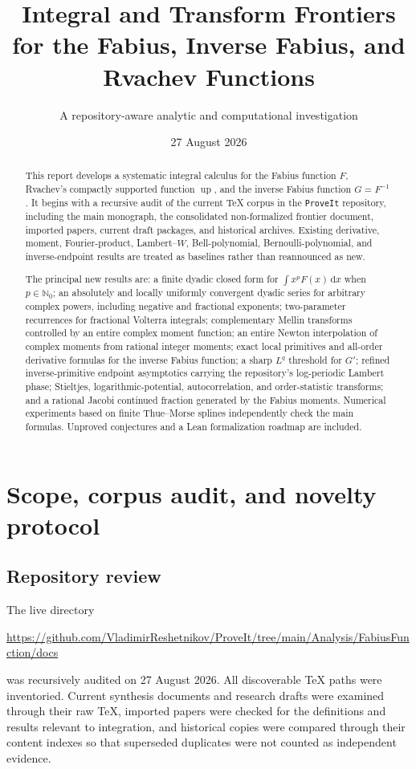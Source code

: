 \documentclass[11pt,oneside]{article}
\title{\bfseries Integral and Transform Frontiers\\[0.25em]
for the Fabius, Inverse Fabius, and Rvachev Functions}
\author{A repository-aware analytic and computational investigation}
\date{27 August 2026}
\theoremstyle{definition}
\theoremstyle{remark}
\newcommand{\N}{\mathbb N}
\newcommand{\dd}{\,\mathrm d}
\newcommand{\upf}{\operatorname{up}}
\newcommand{\repo}{\texttt{ProveIt}}
\begin{document}
\maketitle

\begin{abstract}
This report develops a systematic integral calculus for the Fabius function $F$, Rvachev's compactly supported function $\upf$, and the inverse Fabius function $G=F^{-1}$.  It begins with a recursive audit of the current TeX corpus in the \repo{} repository, including the main monograph, the consolidated non-formalized frontier document, imported papers, current draft packages, and historical archives.  Existing derivative, moment, Fourier-product, Lambert--$W$, Bell-polynomial, Bernoulli-polynomial, and inverse-endpoint results are treated as baselines rather than reannounced as new.

The principal new results are: a finite dyadic closed form for $\int x^pF(x)\dd x$ when $p\in\N_0$; an absolutely and locally uniformly convergent dyadic series for arbitrary complex powers, including negative and fractional exponents; two-parameter recurrences for fractional Volterra integrals; complementary Mellin transforms controlled by an entire complex moment function; an entire Newton interpolation of complex moments from rational integer moments; exact local primitives and all-order derivative formulas for the inverse Fabius function; a sharp $L^q$ threshold for $G'$; refined inverse-primitive endpoint asymptotics carrying the repository's log-periodic Lambert phase; Stieltjes, logarithmic-potential, autocorrelation, and order-statistic transforms; and a rational Jacobi continued fraction generated by the Fabius moments.  Numerical experiments based on finite Thue--Morse splines independently check the main formulas.  Unproved conjectures and a Lean formalization roadmap are included.
\end{abstract}

\tableofcontents
\clearpage

\section{Scope, corpus audit, and novelty protocol}

\subsection{Repository review}

The live directory
\begin{center}
\url{https://github.com/VladimirReshetnikov/ProveIt/tree/main/Analysis/FabiusFunction/docs}
\end{center}
was recursively audited on 27 August 2026.  All discoverable TeX paths were inventoried.  Current synthesis documents and research drafts were examined through their raw TeX, imported papers were checked for the definitions and results relevant to integration, and historical copies were compared through their content indexes so that superseded duplicates were not counted as independent evidence.
\end{document}
